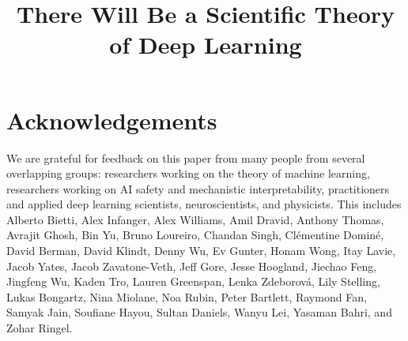 \documentclass{article}
\title{There Will Be a Scientific Theory of Deep Learning}
\date{}
\begin{document}
\maketitle
\vspace{-3mm}

\setcounter{footnote}{0}
\newpage























\section*{Acknowledgements}
We are grateful for feedback on this paper from many people from several overlapping groups: researchers working on the theory of machine learning, researchers working on AI safety and mechanistic interpretability, practitioners and applied deep learning scientists, neuroscientists, and physicists.
This includes
Alberto Bietti,
Alex Infanger,
Alex Williams,
Amil Dravid,
Anthony Thomas,
Avrajit Ghosh,
Bin Yu,
Bruno Loureiro,
Chandan Singh,
Clémentine Dominé,
David Berman,
David Klindt,
Denny Wu,
Ev Gunter,
Honam Wong,
Itay Lavie,
Jacob Yates,
Jacob Zavatone-Veth,
Jeff Gore,
Jesse Hoogland,
Jiechao Feng,
Jingfeng Wu,
Kaden Tro,
Lauren Greenspan,
Lenka Zdeborová,
Lily Stelling,
Lukas Bongartz,
Nina Miolane,
Noa Rubin,
Peter Bartlett,
Raymond Fan,
Samyak Jain,
Soufiane Hayou,
Sultan Daniels,
Wanyu Lei,
Yasaman Bahri,
and
Zohar Ringel.

\newpage

\end{document}
